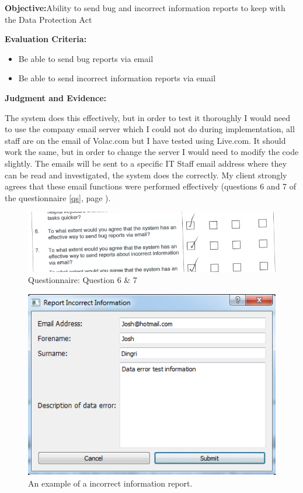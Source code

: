 \textbf{Objective:}Ability to send bug and incorrect information reports to keep with the Data Protection Act

\textbf{Evaluation Criteria:}
\begin{itemize}
\item{Be able to send bug reports via email}
\item{Be able to send incorrect information reports via email}
\end{itemize}

\textbf{Judgment and Evidence:}

The system does this effectively, but in order to test it thoroughly I would need to use the company email server which I could not do during implementation, all staff are on the email of Volac.com but I have tested using Live.com. It should work the same, but in order to change the server I would need to modify the code slightly. The emails will be sent to a specific IT Staff email address where they can be read and investigated, the system does the correctly. My client strongly agrees that these email functions were performed effectively (questions 6 and 7 of the questionnaire \ref{qs}, page \pageref{qs}).

\begin{figure}[H]
    \includegraphics[width=\textwidth]{./Evaluation/EvaluationQuestionnaire/67.png}
    \caption{Questionnaire: Question 6 \& 7} 
\end{figure}


\begin{figure}[H]
    \includegraphics[width=\textwidth]{./Testing/Images/SubmitErrorReport.png}
    \caption{An example of a incorrect information report.} 
\end{figure}


